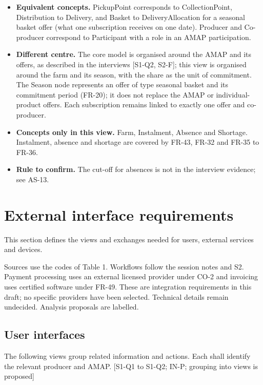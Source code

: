 \documentclass[11pt,a4paper]{article}
\begin{document}
\begin{itemize}
  \item \textbf{Equivalent concepts.} PickupPoint corresponds to CollectionPoint, Distribution to Delivery, and Basket to DeliveryAllocation for a seasonal basket offer (what one subscription receives on one date). Producer and Co-producer correspond to Participant with a role in an AMAP participation.
  \item \textbf{Different centre.} The core model is organised around the AMAP and its offers, as described in the interviews [S1-Q2, S2-F]; this view is organised around the farm and its season, with the share as the unit of commitment. The Season node represents an offer of type seasonal basket and its commitment period (FR-20); it does not replace the AMAP or individual-product offers. Each subscription remains linked to exactly one offer and co-producer.
  \item \textbf{Concepts only in this view.} Farm, Instalment, Absence and Shortage. Instalment, absence and shortage are covered by FR-43, FR-32 and FR-35 to FR-36.
  \item \textbf{Rule to confirm.} The cut-off for absences is not in the interview evidence; see AS-13.
\end{itemize}

\section{External interface requirements}

This section defines the views and exchanges needed for users, external services and devices.

Sources use the codes of Table 1. Workflows follow the session notes and S2. Payment processing uses an external licensed provider under CO-2 and invoicing uses certified software under FR-49. These are integration requirements in this draft; no specific providers have been selected. Technical details remain undecided. Analysis proposals are labelled.


\subsection{User interfaces}

The following views group related information and actions. Each shall identify the relevant producer and AMAP. [S1-Q1 to S1-Q2; IN-P; grouping into views is proposed]
\end{document}
